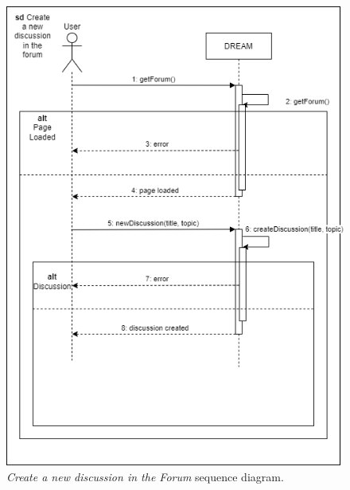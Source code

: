 \begin{figure}[H]
    \centering
    \includegraphics[width=\linewidth]{Images/Use Case/UC8.png}
    \caption{\textit{Create a new discussion in the Forum} sequence diagram.}
\end{figure}
\newpage

